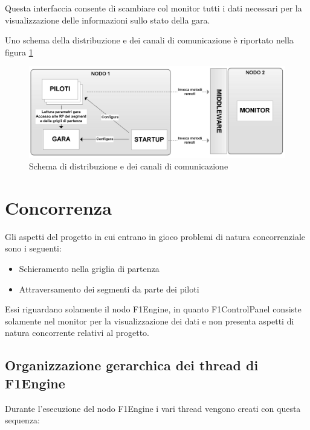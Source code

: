 \documentclass[a4paper,11pt, twoside, openright]{book}
\begin{document}
    Questa interfaccia consente di scambiare col monitor tutti i dati necessari per la visualizzazione delle informazioni
    sullo stato della gara. 
    
    Uno schema della distribuzione e dei canali di comunicazione è riportato nella figura \ref{Fig:SchemaDistribuzione}
      
    \begin{figure}[ht]
      \centering
      \includegraphics[width=130mm]{./Immagini/SchemaDistribuzione.png}
      \caption{Schema di distribuzione e dei canali di comunicazione}
      \label{Fig:SchemaDistribuzione}
    \end{figure}
  
       
  \chapter{Concorrenza}
  \label{Concorrenza}
    Gli aspetti del progetto in cui entrano in gioco problemi di natura concorrenziale sono i seguenti:
    
    \begin{itemize}
      \item Schieramento nella griglia di partenza
      \item Attraversamento dei segmenti da parte dei piloti
    \end{itemize}
    
    Essi riguardano solamente il nodo F1Engine, in quanto F1ControlPanel consiste solamente nel monitor per
    la visualizzazione dei dati e non presenta aspetti di natura concorrente relativi al progetto.
    
    \section{Organizzazione gerarchica dei thread di F1Engine}
      Durante l'esecuzione del nodo F1Engine i vari thread vengono creati con questa sequenza:
      
\end{document}
